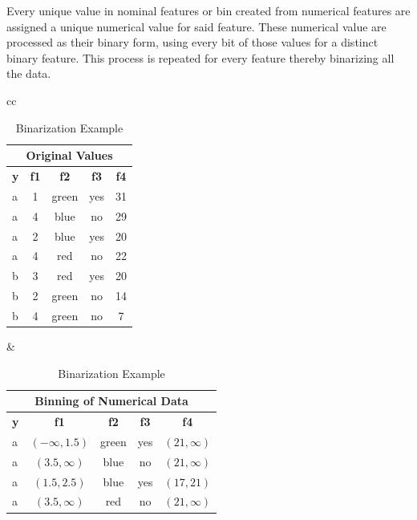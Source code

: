 \documentclass[pdflatex,sn-mathphys-num]{sn-jnl}%
\let\oldcaption\caption
\renewcommand{\caption}[1]{\oldcaption{\centering #1}}
\theoremstyle{thmstyleone}%
\theoremstyle{thmstyletwo}%
\theoremstyle{thmstylethree}%
\begin{document}
Every unique value in nominal features or bin created from numerical features are assigned a unique numerical value for said feature.
These numerical value are processed as their binary form, using every bit of those values for a distinct binary feature.
This process is repeated for every feature thereby binarizing all the data.

\begin{table}[ht!]
  \centering
  \caption{Binarization Example}
  \label{tab:binarization}
  \begin{tabular}{cc}
    \begin{tabular}{|l|c|c|c|c|}
      \hline
      \multicolumn{5}{|c|}{Original Values} \\ \hline
      \textbf{y} & \textbf{f1} & \textbf{f2} & \textbf{f3} & \textbf{f4} \\ \hline
      a          & 1           & green       & yes         & 31          \\
      a          & 4           & blue        & no          & 29          \\
      a          & 2           & blue        & yes         & 20          \\
      a          & 4           & red         & no          & 22          \\
      b          & 3           & red         & yes         & 20          \\
      b          & 2           & green       & no          & 14          \\
      b          & 4           & green       & no          & 7           \\ \hline
    \end{tabular}
      &
    \begin{tabular}{|l|c|c|c|c|}
      \hline
      \multicolumn{5}{|c|}{Binning of Numerical Data} \\ \hline
      \textbf{y} & \textbf{f1}        & \textbf{f2} & \textbf{f3} & \textbf{f4}       \\ \hline
      a          & \((-\infty, 1.5)\) & green       & yes         & \((21, \infty)\)  \\
      a          & \((3.5, \infty)\)  & blue        & no          & \((21, \infty)\)  \\
      a          & \((1.5, 2.5)\)     & blue        & yes         & \((17, 21)\)      \\
      a          & \((3.5, \infty)\)  & red         & no          & \((21, \infty)\)  \\

\end{tabular}
\end{tabular}
\end{table}
\end{document}
